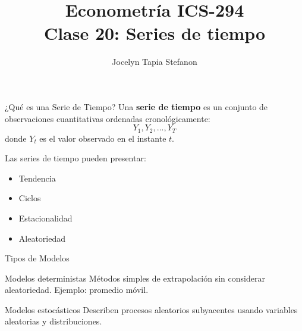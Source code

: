 \documentclass{beamer}
\title[ICS-162]{Econometría ICS-294\\ \small{Clase 20: Series de tiempo}}
\author{Jocelyn Tapia Stefanon}
\institute[USM]
{Universidad Técnica Federico Santa María\\ %
	\medskip
	\textit{} %
	
}
\date{}
\begin{document}
\frame{\titlepage}



\begin{frame}{¿Qué es una Serie de Tiempo?}
Una \textbf{serie de tiempo} es un conjunto de observaciones cuantitativas ordenadas cronológicamente:
\[
Y_1, Y_2, ..., Y_T
\]
donde $Y_t$ es el valor observado en el instante $t$.

Las series de tiempo pueden presentar:
\begin{itemize}
    \item Tendencia
    \item Ciclos
    \item Estacionalidad
    \item Aleatoriedad
\end{itemize}
\end{frame}

\begin{frame}{Tipos de Modelos}
\begin{block}{Modelos deterministas}
Métodos simples de extrapolación sin considerar aleatoriedad. Ejemplo: promedio móvil.
\end{block}

\begin{block}{Modelos estocásticos}
Describen procesos aleatorios subyacentes usando variables aleatorias y distribuciones.
\end{block}
\end{frame}


\end{document}
